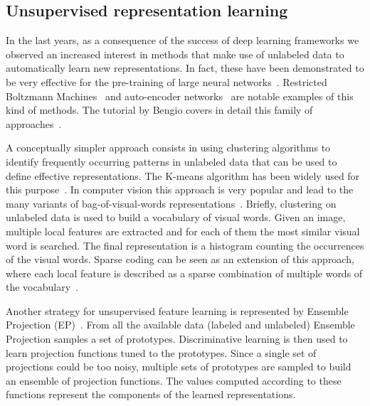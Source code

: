\documentclass[journal,11pt]{IEEEtran}
\begin{document}
\subsection{Unsupervised representation learning}
In the last years,
as a consequence of the success of deep learning frameworks we
observed an increased interest in methods that make use of unlabeled
data to automatically learn new representations.  In fact, these have
been demonstrated to be very effective for the pre-training of large
neural networks~\cite{hinton2006fast,jarrett2009best}.  Restricted
Boltzmann Machines~\cite{hinton2002training} and auto-encoder
networks~\cite{bourlard1988autoassociation} are notable examples of
this kind of methods.  The tutorial by Bengio covers in detail this
family of approaches~\cite{bengio2009learning}.

A conceptually simpler approach consists in using clustering
algorithms to identify frequently occurring patterns in unlabeled data
that can be used to define effective representations.  The K-means
algorithm has been widely used for this
purpose~\cite{coates2012learning}.  In computer vision this approach
is very popular and lead to the many variants of bag-of-visual-words
representations~\cite{csurka2004visual,lazebnik2006beyond}.  Briefly,
clustering on unlabeled data is used to build a vocabulary of visual
words.  Given an image, multiple local features are extracted and for
each of them the most similar visual word is searched.  The final
representation is a histogram counting the occurrences of the visual
words.  Sparse coding can be seen as an extension of this approach,
where each local feature is described as a sparse combination of
multiple words of the
vocabulary~\cite{olshausen1997sparse,mairal2010online,lewicki2000learning}.

Another strategy for unsupervised feature learning is represented by
Ensemble Projection (EP)~\cite{dai2013ensemble}. From all the
available data (labeled and unlabeled) Ensemble Projection samples a
set of prototypes. Discriminative learning is then used to learn
projection functions tuned to the prototypes.  
Since a single set of projections could be too noisy, multiple sets of
prototypes are sampled to build an ensemble of projection functions. The values computed according to these functions represent the
components of the learned representations.
\end{document}
